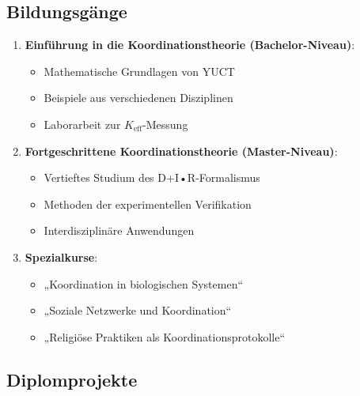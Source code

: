 \documentclass[12pt,a4paper]{article}
\begin{document}
	\subsection{Bildungsgänge}
	
	\begin{enumerate}
		\item \textbf{Einführung in die Koordinationstheorie (Bachelor-Niveau)}:
		\begin{itemize}
			\item Mathematische Grundlagen von YUCT
			\item Beispiele aus verschiedenen Disziplinen
			\item Laborarbeit zur $K_{\mathrm{eff}}$-Messung
		\end{itemize}
		
		\item \textbf{Fortgeschrittene Koordinationstheorie (Master-Niveau)}:
		\begin{itemize}
			\item Vertieftes Studium des D+I•R-Formalismus
			\item Methoden der experimentellen Verifikation
			\item Interdisziplinäre Anwendungen
		\end{itemize}
		
		\item \textbf{Spezialkurse}:
		\begin{itemize}
			\item „Koordination in biologischen Systemen“
			\item „Soziale Netzwerke und Koordination“
			\item „Religiöse Praktiken als Koordinationsprotokolle“
		\end{itemize}
	\end{enumerate}
	
	\subsection{Diplomprojekte}
	
\end{document}
